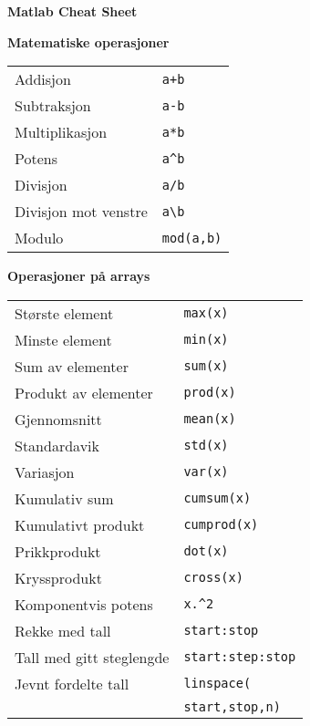 \documentclass[a4paper, 12pt, notitlepage, english]{article}
\begin{document}
\begin{center}
 \Huge \bf Matlab Cheat Sheet
\end{center}

\vspace{1cm}

\begin{multicols}{2}
{\large \bf Matematiske operasjoner}
$ $ \\ \begin{tabular}{l l}
Addisjon & \verb!a+b! \\ 
Subtraksjon & \verb!a-b! \\ 
Multiplikasjon & \verb!a*b! \\ 
Potens & \verb!a^b! \\ 
Divisjon & \verb!a/b! \\ 
Divisjon mot venstre & \verb!a\b! \\ 
Modulo & \verb!mod(a,b)! \\ 
\end{tabular}

\vspace{1cm}

{\large \bf Operasjoner på arrays}
$ $ \\ \begin{tabular}{l l}
Største element & \verb+max(x)+ \\
Minste element & \verb+min(x)+ \\
Sum av elementer & \verb!sum(x)! \\ 
Produkt av elementer & \verb!prod(x)! \\
Gjennomsnitt & \verb!mean(x)! \\ 
Standardavik & \verb!std(x)! \\ 
Variasjon & \verb!var(x)! \\ 
Kumulativ sum & \verb!cumsum(x)! \\ 
Kumulativt produkt & \verb!cumprod(x)! \\
Prikkprodukt & \verb!dot(x)! \\
Kryssprodukt & \verb!cross(x)! \\
Komponentvis potens & \verb+x.^2+ \\
Rekke med tall & \verb+start:stop+ \\
Tall med gitt steglengde & \verb+start:step:stop+ \\
Jevnt fordelte tall & \verb+linspace(+\\& \verb+start,stop,n)+\\
\end{tabular}


\end{multicols}
\end{document}
